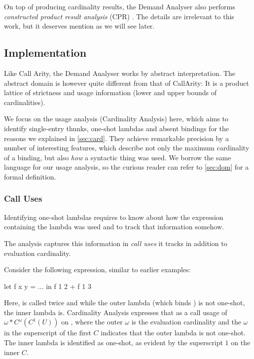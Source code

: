 On top of producing cardinality results, the Demand Analyser also performs \emph{constructed product result analysis} (CPR) \parencite{cpr}. 
The details are irrelevant to this work, but it deserves mention as we will see later.

\subsection{Implementation}

Like Call Arity, the Demand Analyser works by abstract interpretation.
The abstract domain is however quite different from that of CallArity:
It is a product lattice of strictness and usage information (\eg lower and upper bounds of cardinalities).

We focus on the usage analysis (Cardinality Analysis) here, which aims to identify single-entry thunks, one-shot lambdas and absent bindings \parencite[section~2]{card} for the reasons we explained in \cref{sec:card}.
They achieve remarkable precision by a number of interesting features, which describe not only the maximum cardinality of a binding, but also \emph{how} a syntactic thing was used.
We borrow the same language for our usage analysis, so the curious reader can refer to \cref{sec:dom} for a formal definition.

\subsubsection{Call Uses}

Identifying one-shot lambdas requires to know about how the expression containing the lambda was used and to track that information somehow.

The analysis captures this information in \emph{call uses} it tracks in addition to evaluation cardinality.

Consider the following expression, similar to earlier examples:
\begin{haskellcode}
  let f x y = ...
  in f 1 2 + f 1 3
\end{haskellcode}

Here,  is called twice and while the outer lambda (which binds ) is not one-shot, the inner lambda is.
Cardinality Analysis expresses that as a call usage of $\omega*C^\omega(C^1(U))$ on , where the outer $\omega$ is the evaluation cardinality and the $\omega$ in the superscript of the first $C$ indicates that the outer lambda is not one-shot.
The inner lambda is identified as one-shot, as evident by the superscript $1$ on the inner $C$.

